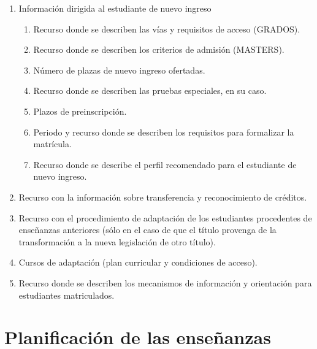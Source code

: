 \begin{enumerate}

    \item{Información dirigida al estudiante de nuevo ingreso}

        \begin{enumerate}

            \item Recurso donde se describen las vías y requisitos de acceso (GRADOS).

            \item Recurso donde se describen los criterios de admisión (MASTERS).

            \item Número de plazas de nuevo ingreso ofertadas.

            \item Recurso donde se describen las pruebas especiales, en su caso.

            \item Plazos de preinscripción.

            \item Periodo y recurso donde se describen los requisitos para formalizar
                la matrícula.

            \item Recurso donde se describe el perfil recomendado para el
                estudiante de nuevo ingreso.

        \end{enumerate}

    \item Recurso con la información sobre transferencia y reconocimiento de créditos.

    \item Recurso con el procedimiento de adaptación de los estudiantes procedentes de enseñanzas anteriores (sólo en el caso de que el título provenga de la transformación a la nueva legislación de otro título).

    \item Cursos de adaptación (plan curricular y condiciones de acceso).

    \item Recurso donde se describen los mecanismos de información y orientación para estudiantes matriculados.

\end{enumerate}

\section{Planificación de las enseñanzas}

